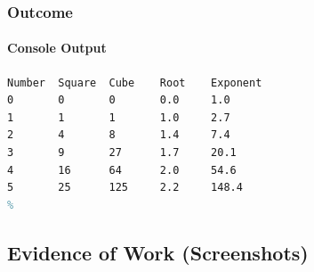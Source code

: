 \documentclass[a4paper,11pt]{article}
\theoremstyle{mytheor}
\begin{document}
\subsubsection{Outcome}
\paragraph{Console Output}
\begin{lstlisting}[escapechar=\%,language=tex,numbers=none,label={list:fourth},title=Program's output to console in plaintext]
Number	Square	Cube	Root	Exponent
0		0		0		0.0		1.0
1		1		1		1.0		2.7
2		4		8		1.4		7.4
3		9		27		1.7		20.1
4		16		64		2.0		54.6
5		25		125		2.2		148.4
%
\end{lstlisting}
\subsection{Evidence of Work (Screenshots)}
\end{document}
